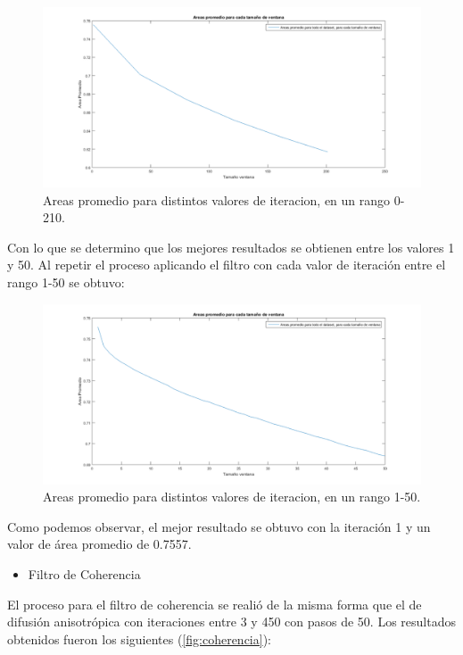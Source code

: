 \begin{figure}[H]
	{
	\centering
	\includegraphics[width=1\textwidth]{Figures/AnisotropicoRangoGrande}
	\caption[An Electron]{Areas promedio para distintos valores de iteracion, en un rango 0-210.}
	\label{fig:anisotropica}
	}
\end{figure}

Con lo que se determino que los mejores resultados se obtienen entre los valores 1 y 50. Al repetir el proceso aplicando el filtro con cada valor de iteración entre el rango 1-50 se obtuvo:

\begin{figure}[H]
	{
	\centering
	\includegraphics[width=1\textwidth]{Figures/AnisotropicoRangoChico}
	\caption[An Electron]{Areas promedio para distintos valores de iteracion, en un rango 1-50.}
	}
\end{figure}

Como podemos observar, el mejor resultado se obtuvo con la iteración 1 y un valor de  área promedio de 0.7557.

\begin{itemize}
	\item[]Filtro de Coherencia
\end{itemize}

El proceso para el filtro de coherencia se reali\'o de la misma forma que el de difusi\'on anisotr\'opica con iteraciones entre 3 y 450 con pasos de 50. Los resultados obtenidos fueron los siguientes (\ref{fig:coherencia}):

